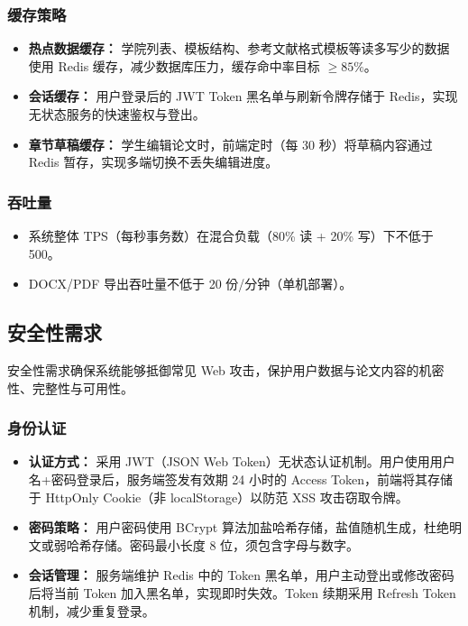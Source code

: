 \subsubsection{缓存策略}

\begin{itemize}
    \item \textbf{热点数据缓存：} 学院列表、模板结构、参考文献格式模板等读多写少的数据使用 Redis 缓存，减少数据库压力，缓存命中率目标 $\ge 85\%$。
    \item \textbf{会话缓存：} 用户登录后的 JWT Token 黑名单与刷新令牌存储于 Redis，实现无状态服务的快速鉴权与登出。
    \item \textbf{章节草稿缓存：} 学生编辑论文时，前端定时（每 30 秒）将草稿内容通过 Redis 暂存，实现多端切换不丢失编辑进度。
\end{itemize}

\subsubsection{吞吐量}

\begin{itemize}
    \item 系统整体 TPS（每秒事务数）在混合负载（80\% 读 + 20\% 写）下不低于 500。
    \item DOCX/PDF 导出吞吐量不低于 20 份/分钟（单机部署）。
\end{itemize}

\subsection{安全性需求}

安全性需求确保系统能够抵御常见 Web 攻击，保护用户数据与论文内容的机密性、完整性与可用性。

\subsubsection{身份认证}

\begin{itemize}
    \item \textbf{认证方式：} 采用 JWT（JSON Web Token）无状态认证机制。用户使用用户名+密码登录后，服务端签发有效期 24 小时的 Access Token，前端将其存储于 HttpOnly Cookie（非 localStorage）以防范 XSS 攻击窃取令牌。
    \item \textbf{密码策略：} 用户密码使用 BCrypt 算法加盐哈希存储，盐值随机生成，杜绝明文或弱哈希存储。密码最小长度 8 位，须包含字母与数字。
    \item \textbf{会话管理：} 服务端维护 Redis 中的 Token 黑名单，用户主动登出或修改密码后将当前 Token 加入黑名单，实现即时失效。Token 续期采用 Refresh Token 机制，减少重复登录。
\end{itemize}

